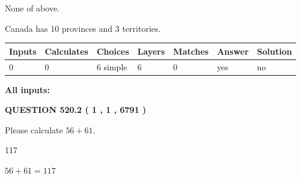 \documentclass[12pt]{article}
\begin{document}
 
 None of above.
 
 
\noindent{}
 
 
Canada has 10  provinces and 3 territories.
 
 
\noindent{}
 
 
   
   
   
   
\noindent\begin{tabular}{|l|l|l|l|l|l|l|}
 \hline
Inputs & Calculates & Choices & Layers & Matches & Answer & Solution \\ \hline
 0  & 
 0  & 
 6
  simple  
  & 
 6  & 
 0  & 
  yes & 
  no 
  \\ \hline
 \end{tabular}
   
   
   
   
\noindent{}
   
   
   
   
\noindent\vspace{0.1in}\hspace{-0.08in} {\textbf{\Large{All inputs: }}}
   
   
  
\vspace{0.2in}
  
{\textbf{\Large{QUESTION
520.2 
 ( 1 , 1 , 6791 )
}}}
  
  
 
Please calculate $ %
56 +  %
61 $.
 
 
 
\noindent{}
 
 

117
 
 
\noindent{}
 
 

 
 
 
\noindent{}
 
 

$ %
56 +  %
61=   %
117$
 
\end{document}
